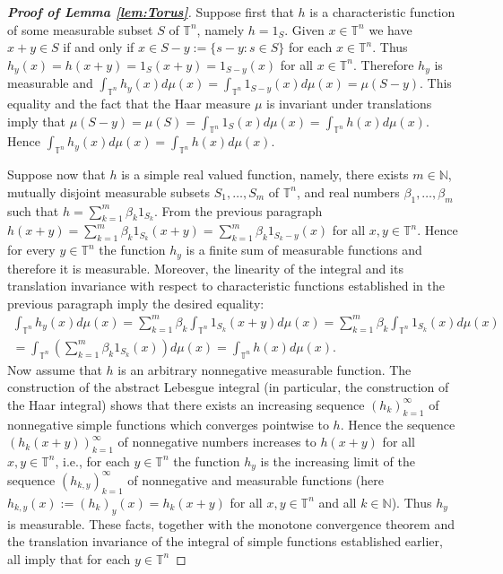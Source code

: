 \documentclass[12 pt]{amsart}
\theoremstyle{definition}
\newcommand{\N}{\mathbb{N}}
\newcommand{\T}{\mathbb{T}}
\newcommand{\bref}[1]{\textbf{\ref{#1}}} %
\begin{document}
\begin{proof}[{\bf Proof of Lemma \bref{lem:Torus}}]
Suppose first that $h$ is a characteristic function of some measurable subset $S$ of $\T^n$, namely $h=1_S$. Given $x\in\T^n$ we have $x+y\in S$ if and only if $x\in S-y:=\{s-y: s\in S\}$ for each $x\in \T^n$. Thus $h_y(x)=h(x+y)=1_S(x+y)=1_{S-y}(x)$ for all $x\in\T^n$. Therefore  $h_y$ is measurable and  $\int_{\T^n}h_y(x)d\mu(x)=\int_{\T^n}1_{S-y}(x)d\mu(x)=\mu(S-y)$. This equality and the fact that the Haar measure $\mu$ is  invariant under translations \cite[p. 285]{Cohn2013book} imply that  $\mu(S-y)=\mu(S)=\int_{\T^n}1_S(x)d\mu(x)=\int_{\T^n}h(x)d\mu(x)$. Hence $\int_{\T^n}h_y(x)d\mu(x)=\int_{\T^n}h(x)d\mu(x)$.

Suppose now that $h$ is a simple real valued function, namely, there exists $m\in\N$, mutually disjoint  measurable subsets $S_1,\ldots,S_m$ of $\T^n$, and real numbers $\beta_1,\ldots,\beta_m$ such that $h=\sum_{k=1}^m \beta_k 1_{S_k}$. From the previous paragraph $h(x+y)=\sum_{k=1}^m \beta_k 1_{S_k}(x+y)=\sum_{k=1}^m \beta_k 1_{S_k-y}(x)$ for all $x,y\in\T^n$. Hence for every $y\in\T^n$ the function $h_y$ is a finite sum of measurable functions and therefore it is measurable. Moreover, the  linearity of the integral and its translation invariance  with respect to characteristic functions established in the previous paragraph imply the desired equality: 
\begin{multline*} \int_{\T^n}h_y(x)d\mu(x)=\sum_{k=1}^m\beta_k\int_{\T^n}1_{S_k}(x+y)d\mu(x)=\sum_{k=1}^m\beta_k\int_{\T^n}1_{S_k}(x)d\mu(x)\\
=\int_{\T^n}\left(\sum_{k=1}^m\beta_k1_{S_k}(x)\right)d\mu(x)=\int_{\T^n}h(x)d\mu(x).
\end{multline*}
Now assume that $h$ is an arbitrary nonnegative measurable function. The construction of the abstract Lebesgue integral (in particular, the construction of the Haar integral) \cite[Chapter 2]{Cohn2013book}  shows that there exists an increasing sequence $(h_k)_{k=1}^{\infty}$ of nonnegative  simple functions which converges pointwise to $h$. Hence the sequence $(h_k(x+y))_{k=1}^{\infty}$ of nonnegative numbers increases to $h(x+y)$ for all $x,y\in\T^n$, i.e., for each $y\in\T^n$ the function  $h_y$ is the increasing limit of the sequence $(h_{k,y})_{k=1}^{\infty}$ of nonnegative and measurable functions (here $h_{k,y}(x):=(h_k)_y(x)=h_k(x+y)$ for all  $x,y\in\T^n$ and all $k\in\N$). Thus $h_y$ is measurable. These facts, together with the monotone  convergence theorem and the translation invariance of the integral of simple functions  established earlier, all imply that for each $y\in\T^n$ 

\end{proof}
\end{document}
